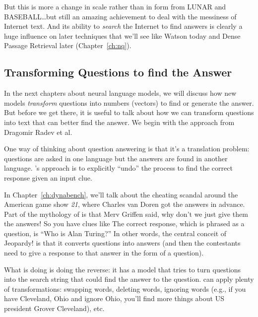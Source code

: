 
But this is more a change in scale rather than in form from LUNAR and
BASEBALL\dots but still an amazing achievement to deal with the
messiness of Internet text.  And its ability to \emph{search} the
Internet to find answers is clearly a huge influence on later
techniques that we’ll see like Watson today and Dense Passage
Retrieval later (Chapter~\ref{ch:nq}).

\subsection{Transforming Questions to find the Answer}


In the next chapters about neural language models, we will discuss how new
models \emph{transform} questions into numbers (vectors) to find or generate
the answer.
%
But before we get there, it is useful to talk about how we can transform
questions into text that can better find the answer.
%
We begin with the  approach from Dragomir Radev et al.

One way of thinking about question answering is that it's a translation
problem: questions are asked in one language but the answers are found in
another language.
%
's approach is to explicitly ``undo'' the process to find the
correct response given an input clue.

In Chapter~\ref{ch:dynabench}, we'll talk about the cheating scandal
around the American game show \textit{21}, where Charles van Doren got
the answers in advance.
%
Part of the mythology of \jeopardy{} is that Merv Griffen said, why
don’t we just give them the answers!
%
So you have clues like 
%
The correct response, which is phrased as a question, is
``Who is Alan Turing?''
%
In other words, the central conceit of Jeopardy! is that it converts questions
into answers (and then the contestants need to give a response to that answer
in the form of a question).

What  is doing is doing the reverse: it has a model that
tries to turn questions into the search string that could find the
answer to the question.
%
 can apply plenty of transformations: swapping words,
deleting words, ignoring words (e.g., if you have Cleveland, Ohio and ignore
Ohio, you’ll find more things about US president Grover Cleveland), etc.

